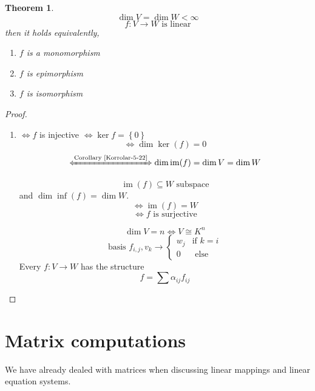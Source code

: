 \documentclass[a4paper,landscape,twocolumn]{article}
\newcommand\set[1]{\left\{#1\right\}}
\newtheorem{theorem}{Theorem}
\DeclareMathOperator\image{im} %
\DeclareMathOperator\kernel{ker} %
\begin{document}
\begin{theorem}
  \label{satz-5-25}
  \[ \dim{V} = \dim{W} < \infty \]
  \[ f: V \rightarrow W \text{ is linear} \]
  then it holds equivalently,
  \begin{enumerate}
    \item $f$ is a monomorphism
    \item $f$ is epimorphism
    \item $f$ is isomorphism
  \end{enumerate}
\end{theorem}
\begin{proof}
  \begin{enumerate}
    \item $\Leftrightarrow f$ is injective $\Leftrightarrow \kernel{f} = \set{0}$
      \[ \Leftrightarrow \dim{\kernel(f)} = 0 \]
      \[ \xLeftrightarrow{\text{Corollary~\ref{Korrolar-5-22}}} \dim{\image(f)} = \dim{V} = \dim{W} \]

      \[ \image(f) \subseteq W \text{ subspace} \]
      and $\dim{\inf(f)} = \dim{W}$.
      \[ \Leftrightarrow \image(f) = W \]
      \[ \Leftrightarrow f \text{ is surjective} \]

      \[ \dim{V} = n \Leftrightarrow V \cong K^n \]
      \[
        \text{basis } f_{i,j}, v_k \rightarrow
        \begin{cases}
          w_j & \text{if } k = i \\
          0 & \text{ else}
        \end{cases}
      \]
      Every $f: V \rightarrow W$ has the structure
      \[ f = \sum \alpha_{ij} f_{ij} \]
  \end{enumerate}
\end{proof}

\section{Matrix computations}
%
We have already dealed with matrices when discussing linear mappings and linear equation systems.
\end{document}
